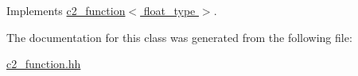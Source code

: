 Implements \hyperlink{classc2__function_a44e0201159111350be7f746fc9026f67}{c2\-\_\-function$<$ float\-\_\-type $>$}.



The documentation for this class was generated from the following file\-:\begin{DoxyCompactItemize}
\item 
\hyperlink{c2__function_8hh}{c2\-\_\-function.\-hh}\end{DoxyCompactItemize}
